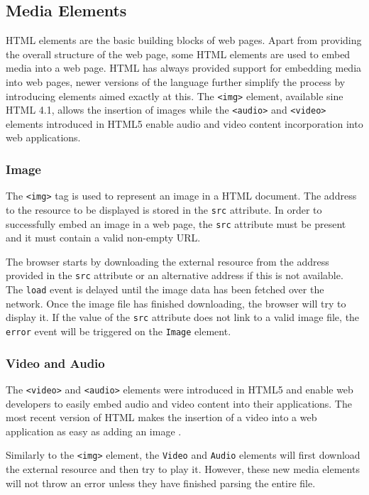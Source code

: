 \documentclass[10pt,a4paper,twoside]{book}
\begin{document}
\subsection{Media Elements}
HTML elements are the basic building blocks of web pages. Apart from providing the overall structure of the web page, some HTML elements are used to embed media into a web page. HTML has always provided support for embedding media into web pages, newer versions of the language further simplify the process by introducing elements aimed exactly at this. The \texttt{<img>} element, available sine HTML 4.1, allows the insertion of images while the \texttt{<audio>} and \texttt{<video>} elements introduced in HTML5 enable audio and video content incorporation into web applications.

\subsubsection{Image}
The \texttt{<img>} tag is used to represent an image in a HTML document. The address to the resource to be displayed is stored in the \texttt{src} attribute. In order to successfully embed an image in a web page, the \texttt{src} attribute must be present and it must contain a valid non-empty URL\cite{berjon2014html}.

The browser starts by downloading the external resource from the address provided in the \texttt{src} attribute or an alternative address if this is not available. The \texttt{load} event is delayed until the image data has been fetched over the network. Once the image file has finished downloading, the browser will try to display it. If the value of the \texttt{src} attribute does not link to a valid image file, the \texttt{error} event will be triggered on the \texttt{Image} element\cite{berjon2014html}.

\subsubsection{Video and Audio}
The \texttt{<video>} and \texttt{<audio>} elements were introduced in HTML5 and enable web developers to easily embed audio and video content into their applications. The most recent version of HTML makes the insertion of a video into a web application as easy as adding an image \cite{berjon2014html}.

Similarly to the \texttt{<img>} element, the \texttt{Video} and  \texttt{Audio} elements will first download the external resource and then try to play it. However, these new media elements will not throw an error unless they have finished parsing the entire file\cite{berjon2014html}.
\end{document}
